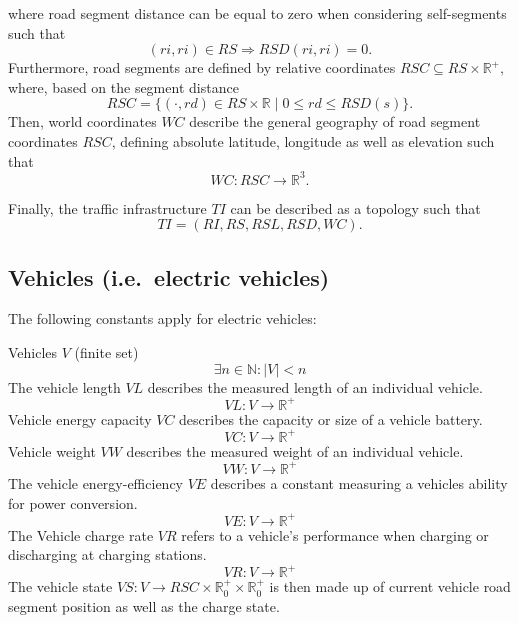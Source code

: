 where road segment distance can be equal to zero when considering self-segments such that
\[
(ri, ri) \in RS \Rightarrow  RSD(ri, ri) = 0 \mathrm{.}
\]
Furthermore, road segments are defined by relative coordinates $RSC \subseteq RS \times \mathbb{R}^+ \mathrm{,}$ where, based on the segment distance
\[
RSC = \{(\cdot, rd) \in RS \times \mathbb{R} \mid 0 \leq rd \leq RSD(s) \} \mathrm{.}
\]
Then, world coordinates $WC$ describe the general geography of road segment coordinates $RSC$, defining absolute latitude, longitude as well as elevation such that
\[
WC : RSC \rightarrow \mathbb{R}^3 \mathrm{.}
\]


Finally, the traffic infrastructure $TI$ can be described as a topology such that 
\[
TI = (RI, RS, RSL, RSD, WC) \mathrm{.}
\]

%	
%	
\subsection{Vehicles (i.e.\ electric vehicles)}
\label{vehicles}
\noindent The following constants apply for electric vehicles: 

Vehicles $V$ (finite set)
\[
\exists n \in \mathbb{N} : |V| < n
\]
The vehicle length $VL$ describes the measured length of an individual vehicle. 
\[
VL : V \rightarrow \mathbb{R}^+
\]
Vehicle energy capacity $VC$ describes the capacity or size of a vehicle battery.
\[
VC : V \rightarrow \mathbb{R}^+
\]
Vehicle weight $VW$ describes the measured weight of an individual vehicle.
\[
VW : V \rightarrow \mathbb{R}^+
\]
The vehicle energy-efficiency $VE$ describes a constant measuring a vehicles ability for power conversion.
\[
VE : V \rightarrow \mathbb{R}^+
\]
The Vehicle charge rate $VR$ refers to a vehicle's performance when charging or discharging at charging stations.
\[
VR : V \rightarrow \mathbb{R}^+
\]
The vehicle state $VS : V \rightarrow RSC \times \mathbb{R}_0^+ \times \mathbb{R}_0^+$ is then made up of current vehicle road segment position as well as the charge state. 

